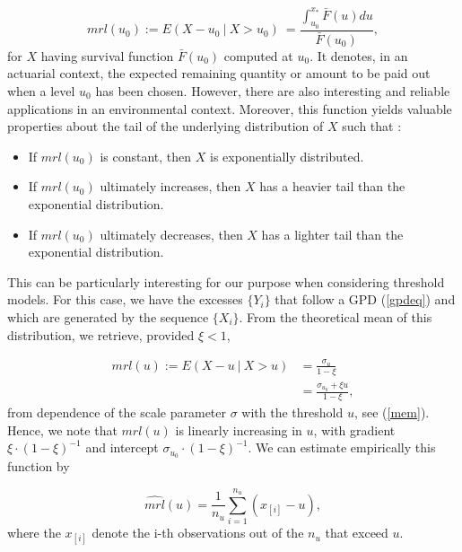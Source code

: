 \begin{equation}
mrl(u_0)
:=E(X-u_0\ |\ X>u_0) 
\ = \frac{\int_{u_0}^{x_*} \bar{F}(u)du}{\bar{F}(u_0)},
\end{equation}
for $X$ having survival function $\bar{F}(u_0)$ computed at $u_0$.
It denotes, in an actuarial context,
the expected remaining quantity or amount to be paid out when a level $u_0$ has been chosen. However, there are also interesting and reliable applications in an environmental context.
Moreover, this function yields valuable properties about the tail of the underlying distribution of $X$ such that :

\begin{itemize}
	\item If $mrl(u_0)$ is constant, then $X$ is exponentially distributed.
	\item If $mrl(u_0)$ ultimately increases, then $X$ has a heavier tail than the exponential distribution.
	\item If $mrl(u_0)$ ultimately decreases, then $X$ has a lighter tail than the exponential distribution.
\end{itemize}
This can be particularly interesting for our purpose when considering threshold models. For this case, we have the excesses $\{Y_i\}$ that follow a GPD (\ref{gpdeq}) and which are generated by the sequence $\{X_i\}$. From the theoretical mean of this distribution, we retrieve, provided $\xi<1$,

\begin{equation} \label{mrl}
\begin{aligned}
mrl(u):=E(X-u\ |\ X>u)
& = \frac{\sigma_u}{1-\xi} \\
& = \frac{\sigma_{u_0}+\xi u}{1-\xi},
\end{aligned}
\end{equation}
from dependence of the scale parameter $\sigma$ with the threshold $u$, see (\ref{mem}). Hence, we note that $mrl(u)$ is linearly increasing in $u$, with gradient $\xi\cdot(1-\xi)^{-1}$ and intercept $\sigma_{u_0}\cdot (1-\xi)^{-1}$. We can estimate empirically this function by 

\begin{equation}\label{mrle}
\widehat{mrl}(u)=\frac{1}{n_u}\sum_{i=1}^{n_u}(x_{[i]}-u),
\end{equation}
where the $x_{[i]}$ denote the i-th observations out of the $n_u$ that exceed $u$.

